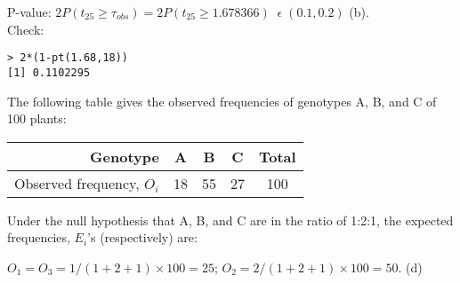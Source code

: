 \documentclass[bigtut]{tutorial}
\begin{document}
\begin{tutorial}
\begin{questions}
\begin{solution}
 P-value: $2 P( t_{25} \geq \tau_{obs}) = 2 P( t_{25} \geq 1.678366 ) \;\; \epsilon \; (0.1,0.2)$ (b).\\

Check:
\begin{verbatim}
> 2*(1-pt(1.68,18))
[1] 0.1102295
\end{verbatim}


\end{solution}


\vspace{1cm}
\hspace{-1cm}

\question 
  The following table gives the observed frequencies of genotypes A, B, and C
  of 100 plants:
   \begin{center}
      \begin{tabular}{|r|ccc|c|}\hline
      Genotype&A&B&C&Total\\ \hline
      Observed frequency, $O_i$&18&55&27&100\\\hline
      \end{tabular}
  \end{center}

 Under the null hypothesis that A, B, and C are in the ratio of 1:2:1, the expected frequencies, $E_i$'s (respectively) are:


\begin{solution}
$O_{1} = O_{3} = 1/(1+2+1) \times 100 = 25$; $O_{2} = 2/(1+2+1) \times 100 = 50$. (d)
\end{solution}




\end{questions}
\end{tutorial}
\end{document}
